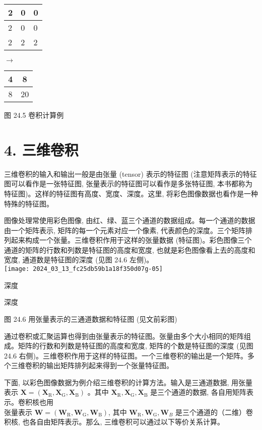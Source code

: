 \documentclass[10pt]{article}
\begin{document}
\begin{center}
\begin{tabular}{|l|l|l|}
\hline
2 & 0 & 0 \\
\hline
2 & 0 & 0 \\
\hline
2 & 2 & 2 \\
\hline
\end{tabular}
\end{center}$\longrightarrow$\begin{tabular}{|c|c|}
\hline
4 & 8 \\
\hline
8 & 20 \\
\hline
\end{tabular}

图 24.5 卷积计算例

\section*{4. 三维卷积}
三维卷积的输入和输出一般是由张量 (tensor) 表示的特征图 (注意矩阵表示的特征图可以看作是一张特征图, 张量表示的特征图可以看作是多张特征图, 本书都称为特征图)。这样的特征图有高度、宽度、深度。这里, 将彩色图像数据也看作是一种特殊的特征图。

图像处理常使用彩色图像, 由红、绿、蓝三个通道的数据组成。每一个通道的数据由一个矩阵表示, 矩阵的每一个元素对应一个像素, 代表颜色的深度。三个矩阵排列起来构成一个张量。三维卷积作用于这样的张量数据 (特征图)。彩色图像三个通道的矩阵的行数和列数是特征图的高度和宽度, 也就是彩色图像看上去的高度和宽度, 通道数是特征图的深度 (见图 24.6 左侧)。\\
\texttt{[image: 2024\_03\_13\_fc25db59b1a18f350d07g-05]}

深度

深度

图 24.6 用张量表示的三通道数据和特征图 (见文前彩图)

通过卷积或汇聚运算也得到由张量表示的特征图。张量由多个大小相同的矩阵组成。矩阵的行数和列数是特征图的高度和宽度, 矩阵的个数是特征图的深度 (见图 24.6 右侧)。三维卷积作用于这样的特征图。一个三维卷积的输出是一个矩阵。多个三维卷积的输出矩阵排列起来得到一个张量特征图。

下面, 以彩色图像数据为例介绍三维卷积的计算方法。输入是三通道数据, 用张量表示 $\boldsymbol{X}=\left(\boldsymbol{X}_{\mathrm{R}}, \boldsymbol{X}_{\mathrm{G}}, \boldsymbol{X}_{\mathrm{B}}\right)$ 。其中 $\boldsymbol{X}_{\mathrm{R}}, \boldsymbol{X}_{\mathrm{G}}, \boldsymbol{X}_{\mathrm{B}}$ 是三个通道的数据, 各自用矩阵表示。卷积核也用\\
张量表示 $\boldsymbol{W}=\left(\boldsymbol{W}_{\mathrm{R}}, \boldsymbol{W}_{\mathrm{G}}, \boldsymbol{W}_{\mathrm{B}}\right)$, 其中 $\boldsymbol{W}_{\mathrm{R}}, \boldsymbol{W}_{\mathrm{G}}, \boldsymbol{W}_{B}$ 是三个通道的（二维）卷积核, 也各自由矩阵表示。那么, 三维卷积可以通过以下等价关系计算。
\end{document}
